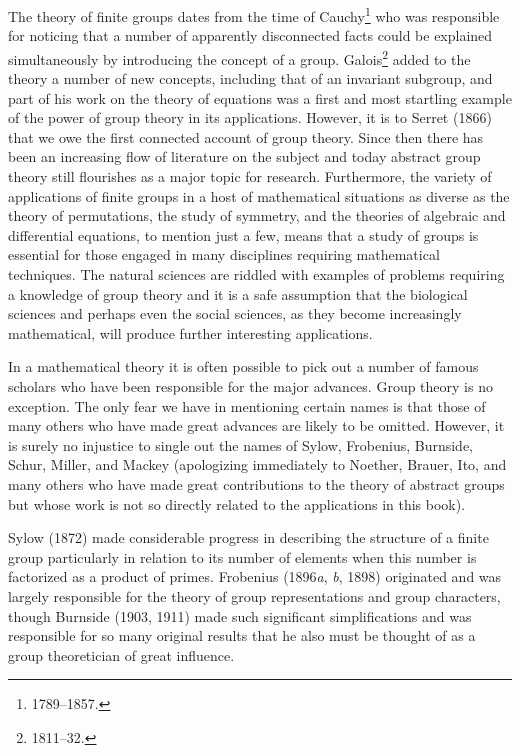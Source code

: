 \documentclass[11pt,a4paper,twoside,openright]{book}
\begin{document}
The theory of finite groups dates from the time of Cauchy\footnote{1789–1857.} who was responsible for noticing that a number of apparently disconnected facts could be explained simultaneously by introducing the concept of a group. Galois\footnote{1811–32.} added to the theory a number of new concepts, including that of an invariant subgroup, and part of his work on the theory of equations was a first and most startling example of the power of group theory in its applications. However, it is to Serret (1866) that we owe the first connected account of group theory. Since then there has been an increasing flow of literature on the subject and today abstract group theory still flourishes as a major topic for research. Furthermore, the variety of applications of finite groups in a host of mathematical situations as diverse as the theory of permutations, the study of symmetry, and the theories of algebraic and differential equations, to mention just a few, means that a study of groups is essential for those engaged in many disciplines requiring mathematical techniques. The natural sciences are riddled with examples of problems requiring a knowledge of group theory and it is a safe assumption that the biological sciences and perhaps even the social sciences, as they become increasingly mathematical, will produce further interesting applications.

In a mathematical theory it is often possible to pick out a number of famous scholars who have been responsible for the major advances. Group theory is no exception. The only fear we have in mentioning certain names is that those of many others who have made great advances are likely to be omitted. However, it is surely no injustice to single out the names of Sylow, Frobenius, Burnside, Schur, Miller, and Mackey (apologizing immediately to Noether, Brauer, Ito, and many others who have made great contributions to the theory of abstract groups but whose work is not so directly related to the applications in this book).

Sylow (1872) made considerable progress in describing the structure of a finite group particularly in relation to its number of elements when this number is factorized as a product of primes. Frobenius (1896\textit{a}, \textit{b}, 1898) originated and was largely responsible for the theory of group representations and group characters, though Burnside (1903, 1911) made such significant simplifications and was responsible for so many original results that he also must be thought of as a group theoretician of great influence.
\end{document}
